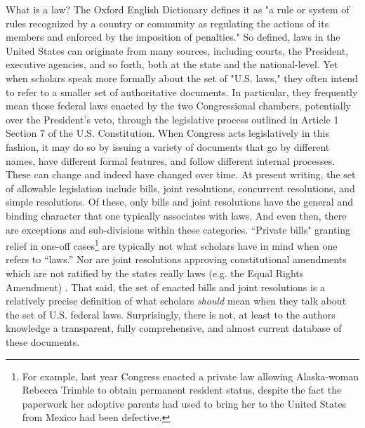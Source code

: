 \documentclass[fleqn,10pt]{wlscirep}
\begin{document}
What is a law? The Oxford English Dictionary defines it as "a rule or system of rules recognized by a country or community as regulating the actions of its members and enforced by the imposition of penalties." \cite{law2008} So defined, laws in the United States can originate from many sources, including courts, the President, executive agencies, and so forth, both at the state and the national-level. Yet when scholars speak more formally about the set of "U.S. laws," they often intend to refer to a smaller set of authoritative documents. In particular, they frequently mean those federal laws enacted by the two Congressional chambers, potentially over the President's veto, through the legislative process outlined in Article 1 Section 7 of the U.S. Constitution. When Congress acts legislatively in this fashion, it may do so by issuing a variety of documents that go by different names, have different formal features, and follow different internal processes. These can change and indeed have changed over time. At present writing, the set of allowable legislation include bills, joint resolutions, concurrent resolutions, and simple resolutions. Of these, only bills and joint resolutions have the general and binding character that one typically associates with laws. And even then, there are exceptions and sub-divisions within these categories. ``Private bills" granting relief in one-off cases\footnote{For example, last year Congress enacted a private law allowing Alaska-woman Rebecca Trimble to obtain permanent resident status, despite the fact the paperwork her adoptive parents had used to bring her to the United States from Mexico had been defective.} are typically not what scholars have in mind when one refers to ``laws.'' Nor are joint resolutions approving constitutional amendments which are not ratified by the states really laws (e.g. the Equal Rights Amendment) . That said, the set of enacted bills and joint resolutions is a relatively precise definition of what scholars \textit{should} mean when they talk about the set of U.S. federal laws. Surprisingly, there is not, at least to the authors knowledge a transparent, fully comprehensive, and almost current database of these documents.
\end{document}
